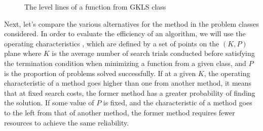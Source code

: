 \documentclass[procedia]{easychair}
\begin{document}
\begin{figure}[ht]
    \centering
    \qquad
    \caption{The level lines of a function from GKLS class}
    \label{fig:gkls_isolines}
\end{figure}
\par
Next, let’s compare the various alternatives for the method in the problem classes
considered. In order to evaluate the efficiency of an algorithm, we will use the
operating characteristics \cite{grishaginClass}, which are defined by a set of
points on the \((K, P)\) plane where \(K\) is the average number of search trials
conducted before satisfying the termination condition when minimizing a function
from a given class, and \(P\) is the proportion of problems solved successfully.
If at a given \(K\), the operating characteristic of a method goes higher than one
from another method, it means that at fixed search costs, the former method has a
greater probability of finding the solution. If some value of \(P\) is fixed, and the
characteristic of a method goes to the left from that of another method, the former
method requires fewer resources to achieve the same reliability.
\end{document}
